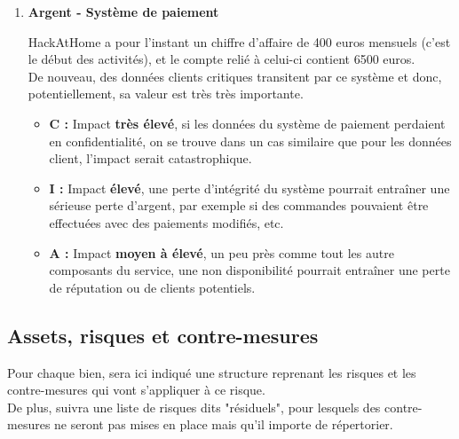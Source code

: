\documentclass[a4paper,10pt,final,fleqn]{article}
\begin{document}
\begin{enumerate}
					\item \textbf{Argent - Système de paiement}

						HackAtHome a pour l'instant un chiffre d'affaire de 400 euros mensuels (c'est le début des activités), et le compte relié à celui-ci contient 6500 euros.\\
						De nouveau, des données clients critiques transitent par ce système et donc, potentiellement, sa valeur est très très importante.\\

						\begin{itemize}
							\item \textbf{C : } Impact \textbf{très élevé}, si les données du système de paiement perdaient en confidentialité, on se trouve dans un cas similaire que pour les données client, l'impact serait catastrophique.
							\item \textbf{I : } Impact \textbf{élevé}, une perte d'intégrité du système pourrait entraîner une sérieuse perte d'argent, par exemple si des commandes pouvaient être effectuées avec des paiements modifiés, etc.
							\item \textbf{A : } Impact \textbf{moyen à élevé}, un peu près comme tout les autre composants du service, une non disponibilité pourrait entraîner une perte de réputation ou de clients potentiels.
						\end{itemize}

				\end{enumerate}

			\subsection{Assets, risques et contre-mesures}

				Pour chaque bien, sera ici indiqué une structure reprenant les risques et les contre-mesures qui vont s'appliquer à ce risque.\\
				De plus, suivra une liste de risques dits "résiduels", pour lesquels des contre-mesures ne seront pas mises en place mais qu'il importe de répertorier.\\
\end{document}
